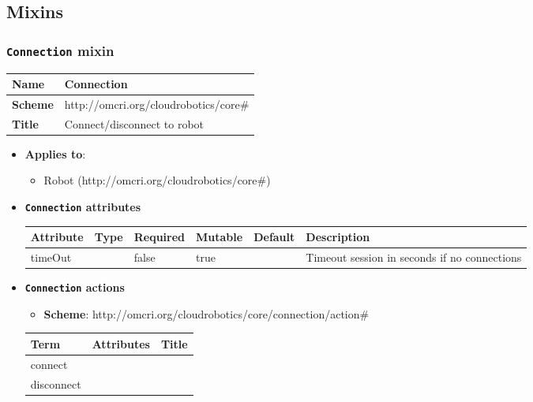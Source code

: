 \subsection{Mixins}
\subsubsection{\texttt{Connection} mixin}
\begin{center}
\begin{tabular}{|l|l|}
  \hline
  \textbf{Name} & Connection \\
  \hline  
  \textbf{Scheme} & http://omcri.org/cloudrobotics/core\# \\
  \hline
  \textbf{Title} & Connect/disconnect to robot \\
  \hline
\end{tabular}
\end{center}
\begin{itemize}
\item \textbf{Applies to}:
\begin{itemize}
	\item Robot (http://omcri.org/cloudrobotics/core\#)
\end{itemize}
\end{itemize} 

\begin{itemize}
\item \textbf{\texttt{Connection} attributes}

\begin{tabularx}{\textwidth}{|l|l|p{1.4cm}|p{1.3cm}|l|X|}
  \hline
  \textbf{Attribute} & \textbf{Type} & \textbf{Required} & \textbf{Mutable} & \textbf{Default} & \textbf{Description} \\
  \hline  
  timeOut &  & false & true &  & Timeout session in seconds if no connections \\
  \hline
\end{tabularx}
\end{itemize}

\begin{itemize}
\item \textbf{\texttt{Connection} actions}

\begin{itemize}
	\item \textbf{Scheme}: http://omcri.org/cloudrobotics/core/connection/action\#
\end{itemize}

\begin{center}
\begin{tabular}{|l|l|l|}
  \hline
  \textbf{Term}  & \textbf{Attributes} & \textbf{Title} \\
  \hline  
  connect & &  \\
  \hline
  disconnect & &  \\
  \hline
\end{tabular}
\end{center}
\end{itemize}

